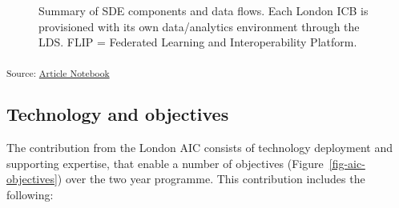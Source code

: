 \documentclass[
  letterpaper,
  DIV=11,
  numbers=noendperiod]{scrartcl}
\begin{document}
\begin{figure}


\caption{\label{fig-sde-summary}Summary of SDE components and data
flows. Each London ICB is provisioned with its own data/analytics
environment through the LDS. FLIP = Federated Learning and
Interoperability Platform.}

\end{figure}%

\textsubscript{Source:
\href{https://d3london.github.io/sde_aic_docs/index.qmd.html}{Article
Notebook}}

\subsection{Technology and objectives}\label{technology-and-objectives}

The contribution from the London AIC consists of technology deployment
and supporting expertise, that enable a number of objectives
(Figure~\ref{fig-aic-objectives}) over the two year programme. This
contribution includes the following:
\end{document}
